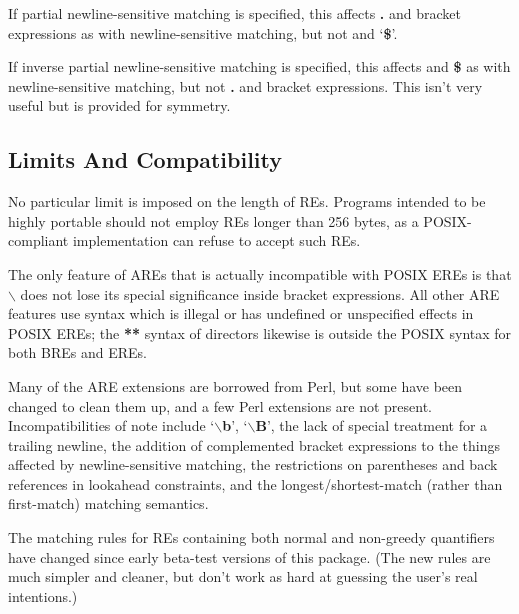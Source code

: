 If partial newline-sensitive matching is specified,
this affects {\bf .} and bracket expressions as with newline-sensitive matching,
but not {\bf \caret} and `{\bf \$}'. 

If inverse partial newline-sensitive matching is specified,
this affects {\bf \caret} and {\bf \$} as with newline-sensitive matching, but not {\bf .} and bracket
expressions. This isn't very useful but is provided for symmetry. 

\subsection{Limits And Compatibility}\label{relimits}


No particular limit is imposed on the length of REs. Programs
intended to be highly portable should not employ REs longer than 256 bytes,
as a POSIX-compliant implementation can refuse to accept such REs. 

The only
feature of AREs that is actually incompatible with POSIX EREs is that {\bf $\backslash$}
does not lose its special significance inside bracket expressions. All other
ARE features use syntax which is illegal or has undefined or unspecified
effects in POSIX EREs; the {\bf ***} syntax of directors likewise is outside
the POSIX syntax for both BREs and EREs. 

Many of the ARE extensions are
borrowed from Perl, but some have been changed to clean them up, and a
few Perl extensions are not present. Incompatibilities of note include `{\bf $\backslash$b}',
`{\bf $\backslash$B}', the lack of special treatment for a trailing newline, the addition of
complemented bracket expressions to the things affected by newline-sensitive
matching, the restrictions on parentheses and back references in lookahead
constraints, and the longest/shortest-match (rather than first-match) matching
semantics. 

The matching rules for REs containing both normal and non-greedy
quantifiers have changed since early beta-test versions of this package.
(The new rules are much simpler and cleaner, but don't work as hard at guessing
the user's real intentions.) 

